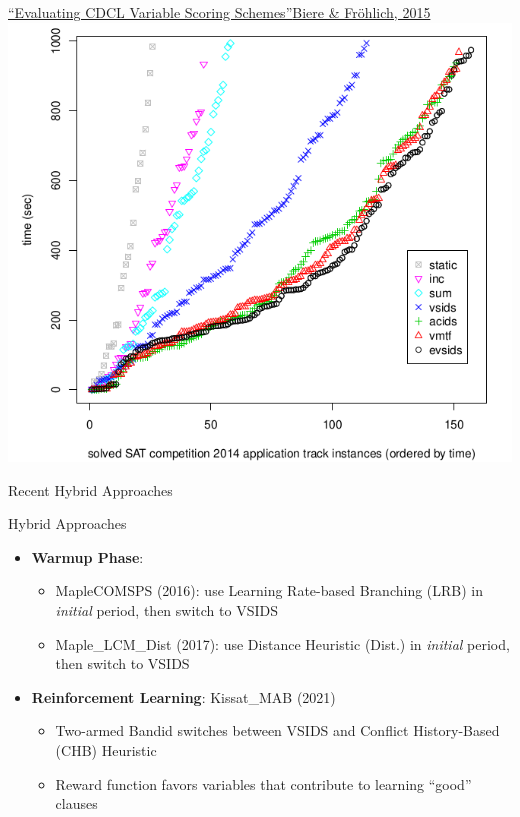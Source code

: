 \documentclass[t]{sdqbeamer}
\begin{document}
\begin{frame}{\href{https://doi.org/10.1007/978-3-319-24318-4_29}{``Evaluating CDCL Variable Scoring Schemes''}}{\href{https://doi.org/10.1007/978-3-319-24318-4_29}{Biere \& Fröhlich, 2015}}
\vspace*{-3em}
\centering
\includegraphics[width=.56\linewidth]{figures/l06/evsids-vmtf-acids-froehlich2015.png}
\end{frame}
    
\begin{frame}{Recent Hybrid Approaches}
\begin{block}{Hybrid Approaches} 
\begin{itemize}\setlength{\itemsep}{1em}
\item {\bf Warmup Phase}:
\begin{itemize}\setlength{\itemsep}{1ex}
    \item MapleCOMSPS (2016): use Learning Rate-based Branching (LRB) in \emph{initial} period, then switch to VSIDS
    \item Maple\_LCM\_Dist (2017): use Distance Heuristic (Dist.) in \emph{initial} period, then switch to VSIDS
\end{itemize}
\item {\bf Reinforcement Learning}: Kissat\_MAB (2021)
\begin{itemize}\setlength{\itemsep}{1ex}
    \item Two-armed Bandid switches between VSIDS and Conflict History-Based (CHB) Heuristic
    \item Reward function favors variables that contribute to learning ``good'' clauses
    \end{itemize}
\end{itemize}
\end{block}
\end{frame}
\end{document}
